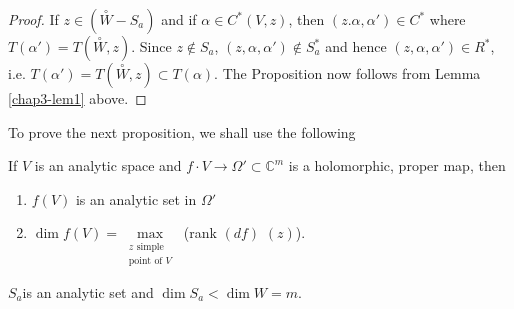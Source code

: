 \begin{proof} %
  If $z\in(\overset{\circ}{W}-S_a)$ and if $\alpha\in
  C^*(V,z)$, then $(z.\alpha,\alpha')\in C^*$ where $T(\alpha') =
  T(\overset{\circ}{W},z)$. Since $z\notin S_a$,
  $(z,\alpha,\alpha')\notin S^*_a$ and hence $(z,\alpha,\alpha')\in
  R^*$, i.e. $T(\alpha') = T(\overset{\circ}{W},z)\subset T (\alpha)$.
  The Proposition now follows from Lemma \ref{chap3-lem1} above. 
\end{proof}

To prove the next proposition, we shall use the following 

\begin{theorem*}[(Remmert).] %
  If $V$ is an analytic space and $f\cdot V \to \Omega' \subset
  \mathbb{C}^m$ is a holomorphic, proper map, then 
  \begin{enumerate}[\rm(1)]
  \item $f(V)$ is an analytic set in $\Omega'$
  \item $\dim f(V)= \max\limits_{\substack{z\text{ simple}
      \\ \text{point of }V}}$  (rank $(df)$ $(z)$).  
  \end{enumerate}
\end{theorem*}

\begin{proposition} %
$S_a$\pageoriginale is an analytic set and $\dim S_a < \dim W = m$. 
\end{proposition}


